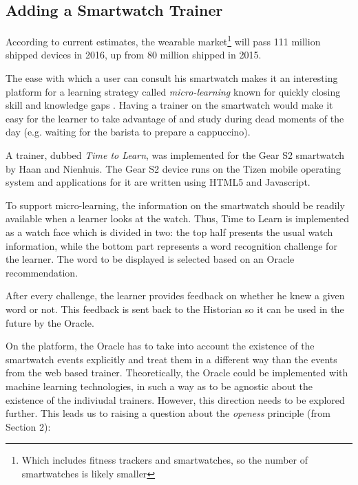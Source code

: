 

\subsection {Adding a Smartwatch Trainer}

According to current estimates, the wearable market\footnote{Which includes fitness trackers and smartwatches, so the number of smartwatches is likely smaller} will pass 111 million shipped devices in 2016, up from 80 million shipped in 2015. 

The ease with which a user can consult his smartwatch makes it an interesting platform for a learning strategy called {\em micro-learning} known for quickly closing skill and knowledge gaps  \cite{Dear12}. Having a trainer on the smartwatch would make it easy for the learner to take advantage of and study during dead moments of the day (e.g. waiting for the barista to prepare a cappuccino).

A trainer, dubbed {\em Time to Learn}, was implemented for the Gear S2 smartwatch by Haan and Nienhuis\cite{Nien16time}. The Gear S2 device runs on the Tizen mobile operating system and applications for it are written using HTML5 and Javascript.

To support micro-learning, the information on the smartwatch should be readily available when a learner looks at the watch. Thus, Time to Learn is implemented as a watch face which is divided in two: the top half presents the usual watch information, while the bottom part represents a word recognition challenge for the learner. The word to be displayed is selected based on an Oracle recommendation. 

After every challenge, the learner provides feedback on whether he knew a given word or not. This feedback is sent back to the Historian so it can be used in the future by the Oracle.


On the platform, the Oracle has to take into account the existence of the smartwatch events explicitly and treat them in a different way than the events from the web based trainer. 
Theoretically, the Oracle could be implemented with machine learning technologies, in such a way as to be agnostic about the existence of the indiviudal trainers. However, this direction needs to be explored further. This leads us to raising a question about the {\em openess} principle (from Section 2): 



